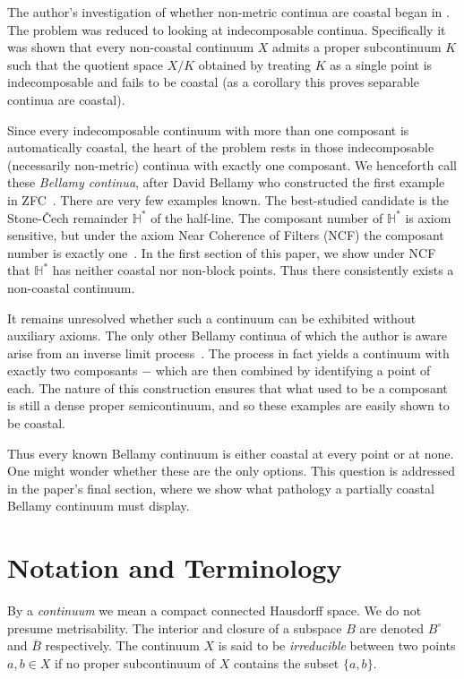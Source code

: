 \documentclass[12pt]{article}
\theoremstyle{plain}
\theoremstyle{definition}
\newcommand{\HH}{\ensuremath{\mathbb H}}
\newcommand{\0}{\ensuremath{\varnothing}}
\begin{document}
	The author's investigation of whether non-metric continua are coastal began in \cite{me1}. 
	The problem was reduced to looking at indecomposable continua. 
	Specifically it was shown that every non-coastal continuum $X$ admits a proper subcontinuum $K$ such 
	that the quotient space $X/K$ obtained by treating $K$ as a single point is indecomposable and fails to be coastal 
	(as a corollary this proves separable continua are coastal).
	
	Since every indecomposable continuum with more than one composant is automatically coastal, 
	the heart of the problem rests in those indecomposable (necessarily non-metric) continua with exactly one composant. 
	We henceforth call these \textit{Bellamy continua}, after David Bellamy who constructed the first example in ZFC~\cite{one}. 
	There are very few examples known. The best-studied candidate is the Stone-\v Cech remainder $\HH^*$ of the half-line. 
	The composant number of $\HH^*$ is axiom sensitive, but under the axiom Near Coherence of Filters (NCF) the composant number is exactly one~\cite{NCF2}. 
	In the first section of this paper, we show under NCF that $\HH^*$ has neither coastal nor non-block points. 
	Thus there consistently exists a non-coastal continuum.
	
	It remains unresolved whether such a continuum can be exhibited without auxiliary axioms. 
	The only other Bellamy continua of which the author is aware arise from an inverse limit process~\cite{one,smith2,smith1}. 
	The process in fact yields a continuum with exactly two composants $-$ which are then combined by identifying a point of each. 
	The nature of this construction ensures that what used to be a composant is still a dense proper semicontinuum, 
	and so these examples are easily shown to be coastal. 
	
	Thus every known Bellamy continuum is either coastal at every point or at none. 
	One might wonder whether these are the only options. 
	This question is addressed in the paper's final section, where we show what pathology a partially coastal Bellamy continuum must display.
	
	
	\section{Notation and Terminology}
	
	\noindent 
	By a \textit{continuum} we mean a compact connected Hausdorff space. 
	We do not presume metrisability. 
	The interior and closure of a subspace $B$ are denoted $B^\circ$ and $\overline {B}$ respectively. 
	The continuum $X$ is said to be \textit{irreducible} between two points $a,b \in X$ if no proper subcontinuum of $X$ contains the subset $\{a,b\}$. 
	
\end{document}
